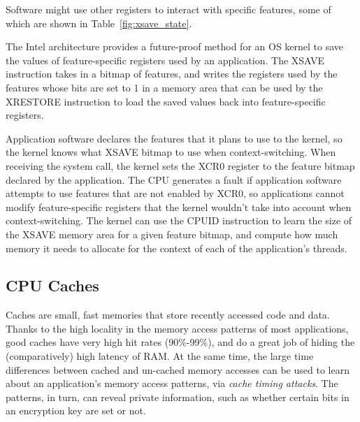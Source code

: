 Software might use other registers to interact with specific features, some of
which are shown in Table~\ref{fig:xsave_state}.

\begin{table}[hbt]
  \caption{Sample feature-specific Intel architecture registers.}
  \label{fig:xsave_state}
\end{table}

The Intel architecture provides a future-proof method for an OS kernel to save
the values of feature-specific registers used by an application. The XSAVE
instruction takes in a bitmap of features, and writes the registers used by
the features whose bits are set to 1 in a memory area that can be used by the
XRESTORE instruction to load the saved values back into feature-specific
registers.

Application software declares the features that it plans to use to the kernel,
so the kernel knows what XSAVE bitmap to use when context-switching. When
receiving the system call, the kernel sets the XCR0 register to the feature
bitmap declared by the application. The CPU generates a fault if application
software attempts to use features that are not enabled by XCR0, so applications
cannot modify feature-specific registers that the kernel wouldn't take into
account when context-switching. The kernel can use the CPUID instruction to
learn the size of the XSAVE memory area for a given feature bitmap, and compute
how much memory it needs to allocate for the context of each of the
application's threads.


\subsection{CPU Caches}
\label{sec:caching}

Caches are small, fast memories that store recently accessed code and data.
Thanks to the high locality in the memory access patterns of most applications,
good caches have very high hit rates (90\%-99\%), and do a great job of hiding
the (comparatively) high latency of RAM. At the same time, the large time
differences between cached and un-cached memory accesses can be used to learn
about an application's memory access patterns, via
\textit{cache timing attacks}\cite{banescu2011cache}. The patterns, in turn,
can reveal private information, such as whether certain bits in an encryption
key are set or not.

